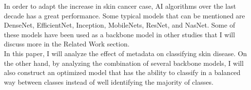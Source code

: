 In order to adapt the increase in skin cancer case, AI algorithms over the last decade has a great performance. Some typical models that can be mentioned are DenseNet\cite{06993}, EfficientNet\cite{04861}, Inception\cite{00567}, MobileNets\cite{04861}\cite{04381}\cite{02244}, ResNet\cite{03385}\cite{05027}, and NasNet\cite{07012}. Some of these models have been used as a backbone model in other studies that I will discuss more in the Related Work section. \\
In this paper, I will analyze the effect of metadata on classifying skin disease. On the other hand, by analyzing the combination of several backbone models, I will also construct an optimized model that has the ability to classify in a balanced way between classes instead of well identifying the majority of classes. 

